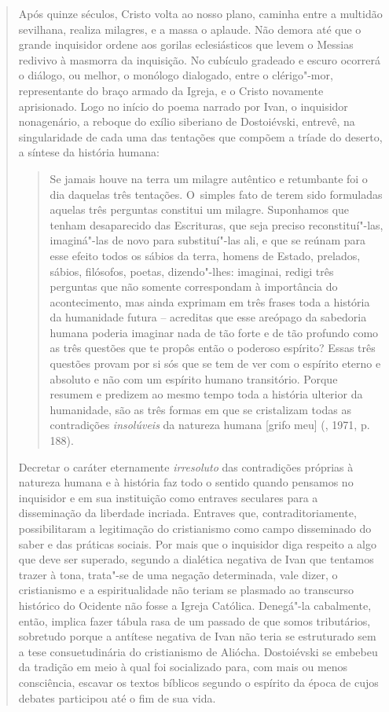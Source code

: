 {\begin{quote}
Após quinze séculos, Cristo volta ao nosso plano, caminha entre a
multidão sevilhana, realiza milagres, e a massa o aplaude. Não demora
até que o grande inquisidor ordene aos gorilas eclesiásticos que levem o
Messias redivivo à masmorra da inquisição. No cubículo gradeado e escuro
ocorrerá o diálogo, ou melhor, o monólogo dialogado, entre o
clérigo"-mor, representante do braço armado da Igreja, e o Cristo
novamente aprisionado. Logo no início do poema narrado por Ivan, o
inquisidor nonagenário, a reboque do exílio siberiano de Dostoiévski,
entrevê, na singularidade de cada uma das tentações que compõem a tríade
do deserto, a síntese da história humana:

\begin{quote}
Se jamais houve na terra um milagre autêntico e retumbante foi o dia
daquelas três tentações. O~simples fato de terem sido formuladas aquelas
três perguntas constitui um milagre. Suponhamos que tenham desaparecido
das Escrituras, que seja preciso reconstituí"-las, imaginá"-las de novo
para substituí"-las ali, e que se reúnam para esse efeito todos os sábios
da terra, homens de Estado, prelados, sábios, filósofos, poetas,
dizendo"-lhes: imaginai, redigi três perguntas que não somente
correspondam à importância do acontecimento, mas ainda exprimam em três
frases toda a história da humanidade futura -- acreditas que esse
areópago da sabedoria humana poderia imaginar nada de tão forte e de tão
profundo como as três questões que te propôs então o poderoso espírito?
Essas três questões provam por si sós que se tem de ver com o espírito
eterno e absoluto e não com um espírito humano transitório. Porque
resumem e predizem ao mesmo tempo toda a história ulterior da
humanidade, são as três formas em que se cristalizam todas as
contradições \emph{insolúveis} da natureza humana {[}grifo meu{]}
(, 1971, p. 188).
\end{quote}

Decretar o caráter eternamente \emph{irresoluto} das contradições
próprias à natureza humana e à história faz todo o sentido quando
pensamos no inquisidor e em sua instituição como entraves seculares para
a disseminação da liberdade incriada. Entraves que, contraditoriamente,
possibilitaram a legitimação do cristianismo como campo disseminado do
saber e das práticas sociais. Por mais que o inquisidor diga respeito a
algo que deve ser superado, segundo a dialética negativa de Ivan que
tentamos trazer à tona, trata"-se de uma negação determinada, vale dizer,
o cristianismo e a espiritualidade não teriam se plasmado ao transcurso
histórico do Ocidente não fosse a Igreja Católica. Denegá"-la cabalmente,
então, implica fazer tábula rasa de um passado de que somos tributários,
sobretudo porque a antítese negativa de Ivan não teria se estruturado
sem a tese consuetudinária do cristianismo de Aliócha. Dostoiévski se
embebeu da tradição em meio à qual foi socializado para, com mais ou
menos consciência, escavar os textos bíblicos segundo o espírito da
época de cujos debates participou até o fim de sua vida.


\end{quote}}
